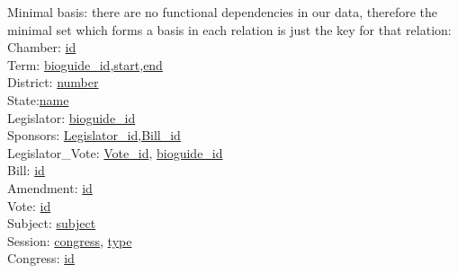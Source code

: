 \documentclass{article}
\begin{document}
\noindent
Minimal basis: there are no functional dependencies in our data, therefore the minimal set which forms a basis in each relation is just the key for that relation:\\
Chamber: \underline{id}\\
Term: \underline{bioguide\_id},\underline{start},\underline{end}\\
District: \underline{number}\\
State:\underline{name}\\
Legislator: \underline{bioguide\_id}\\
Sponsors: \underline{Legislator\_id},\underline{Bill\_id}\\
Legislator\_Vote: \underline{Vote\_id}, \underline{bioguide\_id}\\
Bill: \underline{id}\\
Amendment: \underline{id}\\
Vote: \underline{id}\\
Subject: \underline{subject}\\
Session: \underline{congress}, \underline{type}\\
Congress: \underline{id}\\
\end{document}

